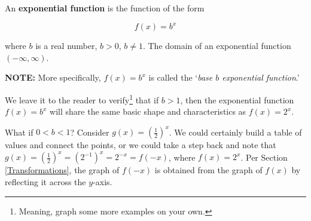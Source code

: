 \smallskip


\colorbox{ResultColor}{\bbm  

\begin{defn}\label{expfcndefn}    An \textbf{exponential function} is the function of the form


\[ f(x) = b^{x}\]

 where $b$ is a  real number, $b > 0$, $b \neq 1$.   The domain of an exponential function  $(-\infty, \infty)$.
 
 \textbf{NOTE:}  More specifically, $f(x) = b^{x}$ is called the `\textit{base $b$ exponential function}.'
\end{defn}


\ebm}

\smallskip

We leave it to the reader to verify\footnote{Meaning, graph some more examples on your own.} that if $b > 1$, then the exponential function $f(x) = b^{x}$ will share the same basic shape and characteristics as $f(x) = 2^{x}$.  

\smallskip

What if $0 < b < 1$?  Consider $g(x) = \left(\frac{1}{2}\right)^{x}$.  We could certainly build a table of values and connect the points, or we could take a step back and note that $g(x) = \left(\frac{1}{2}\right)^{x} = \left(2^{-1}\right)^{x} = 2^{-x} = f(-x)$, where $f(x) = 2^{x}$.  Per Section \ref{Transformations}, the graph of $f(-x)$ is obtained from the graph of $f(x)$ by reflecting it across the $y$-axis. 


